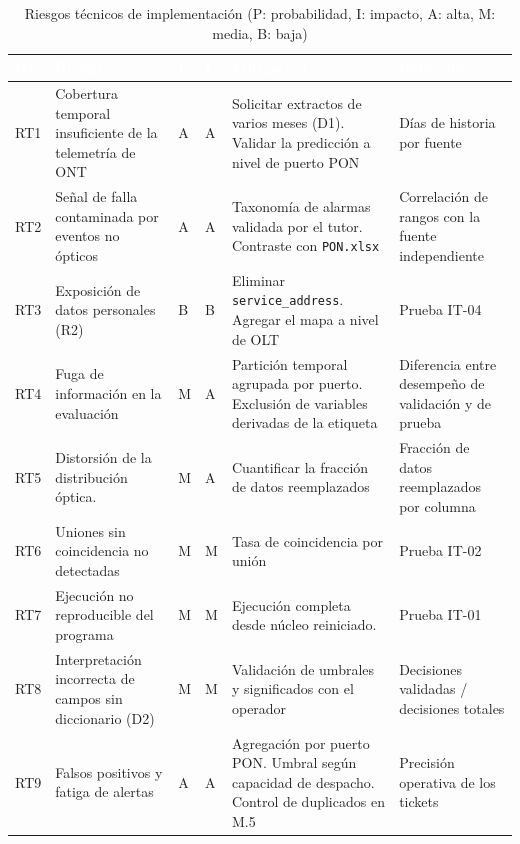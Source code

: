 \documentclass[12pt,a4paper]{article}
\begin{document}
\begin{table}[htbp]
\centering
\caption{Riesgos técnicos de implementación (P: probabilidad, I: impacto, A: alta, M: media, B: baja)}
\label{tab:riesgos_tecnicos}
\small
\renewcommand{\arraystretch}{1.3}
\begin{tabularx}{\textwidth}{|p{0.9cm}|X|p{0.4cm}|p{0.4cm}|X|X|}
\hline
\rowcolor{black}
\textcolor{white}{\textbf{ID}} & \textcolor{white}{\textbf{Riesgo}} & \textcolor{white}{\textbf{P}} & \textcolor{white}{\textbf{I}} & \textcolor{white}{\textbf{Mitigación}} & \textcolor{white}{\textbf{Indicador}} \\ \hline
RT1 & Cobertura temporal insuficiente de la telemetría de ONT & A & A & Solicitar extractos de varios meses (D1). Validar la predicción a nivel de puerto PON & Días de historia por fuente \\ \hline
RT2 & Señal de falla contaminada por eventos no ópticos & A & A & Taxonomía de alarmas validada por el tutor. Contraste con \texttt{PON.xlsx} & Correlación de rangos con la fuente independiente \\ \hline
RT3 & Exposición de datos personales (R2) & B & B & Eliminar \texttt{service\_address}. Agregar el mapa a nivel de OLT & Prueba IT-04 \\ \hline
RT4 & Fuga de información en la evaluación & M & A & Partición temporal agrupada por puerto. Exclusión de variables derivadas de la etiqueta & Diferencia entre desempeño de validación y de prueba \\ \hline
RT5 & Distorsión de la distribución óptica. & M & A & Cuantificar la fracción de datos reemplazados & Fracción de datos reemplazados por columna \\ \hline
RT6 & Uniones sin coincidencia no detectadas & M & M & Tasa de coincidencia por unión & Prueba IT-02 \\ \hline
RT7 & Ejecución no reproducible del programa & M & M & Ejecución completa desde núcleo reiniciado. & Prueba IT-01 \\ \hline
RT8 & Interpretación incorrecta de campos sin diccionario (D2) & M & M & Validación de umbrales y significados con el operador & Decisiones validadas / decisiones totales \\ \hline
RT9 & Falsos positivos y fatiga de alertas & A & A & Agregación por puerto PON. Umbral según capacidad de despacho. Control de duplicados en M.5 & Precisión operativa de los tickets \\ \hline
\end{tabularx}
\end{table}
\end{document}

